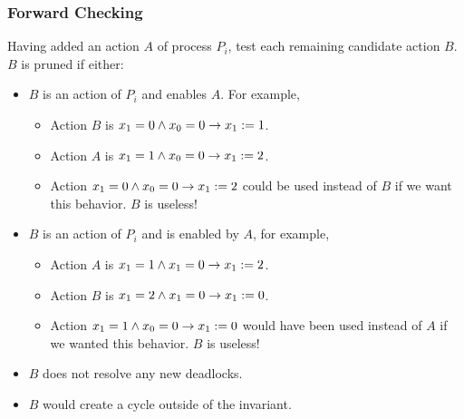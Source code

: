 \documentclass[handout]{beamer}
\begin{document}
\begin{frame}
\frametitle{Forward Checking}
Having added an action $A$ of process $P_i$, test each remaining candidate action $B$.
$B$ is pruned if either:
\begin{itemize}
\item $B$ is an action of $P_i$ and enables $A$. For example,
 \begin{itemize}
 \item[] Action $B$ is $x_1 = 0 \wedge x_0 = 0 \to x_1:= 1$.
 \item[] Action $A$ is $x_1 = 1 \wedge x_0 = 0 \to x_1:= 2$.
 \item Action $x_1 = 0 \wedge x_0 = 0 \to x_1:= 2$ could be used instead of $B$ if we want this behavior. $B$ is useless!
 \end{itemize}
\item $B$ is an action of $P_i$ and is enabled by $A$, for example,
 \begin{itemize}
 \item[] Action $A$ is $x_1 = 1 \wedge x_1 = 0 \to x_1:= 2$.
 \item[] Action $B$ is $x_1 = 2 \wedge x_1 = 0 \to x_1:= 0$.
 \item Action $x_1 = 1 \wedge x_0 = 0 \to x_1:= 0$ would have been used instead of $A$ if we wanted this behavior. $B$ is useless!
 \end{itemize}
\item $B$ does not resolve any new deadlocks.
\item $B$ would create a cycle outside of the invariant.
\end{itemize}
\end{frame}
\end{document}
